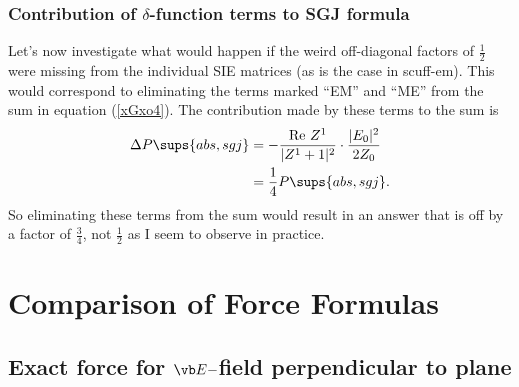 \documentclass{article}
\begin{document}
\subsubsection{Contribution of $\delta$-function terms to SGJ formula}

Let's now investigate what would happen if the weird off-diagonal
factors of $\frac{1}{2}$ were missing from the individual SIE
matrices (as is the case in {\sc scuff-em}). This would correspond
to eliminating the terms marked ``EM'' and ``ME'' from the sum in
equation (\ref{xGxo4}). The contribution made by these terms to the 
sum is 
\begin{align*}
\Delta P\sups{abs,{\sc sgj}} 
  &= -\frac{\text{Re }Z^1}{|Z^1+1|^2}\cdot \frac{|E_0|^2}{2Z_0}
\\
  &=\frac{1}{4}P\sups{abs,{\sc sgj}}.
\end{align*}
So eliminating these terms from the sum would result in an answer
that is off by a factor of $\frac{3}{4}$, not $\frac{1}{2}$ as I seem
to observe in practice.


\newpage
\section{Comparison of Force Formulas}

\subsection*{Exact force for $\vb E-$field perpendicular to plane}
\end{document}
